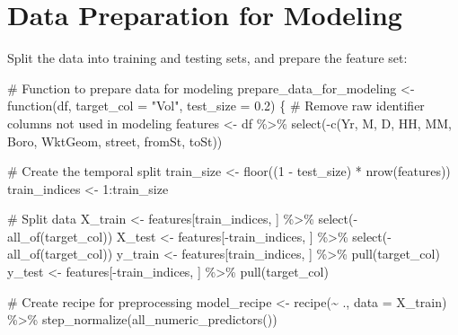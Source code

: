 \documentclass[
  letterpaper,
  DIV=11,
  numbers=noendperiod]{scrreprt}
\newenvironment{Shaded}{\begin{snugshade}}{\end{snugshade}}
\newcommand{\AttributeTok}[1]{\textcolor[rgb]{0.40,0.45,0.13}{#1}}
\newcommand{\CommentTok}[1]{\textcolor[rgb]{0.37,0.37,0.37}{#1}}
\newcommand{\ControlFlowTok}[1]{\textcolor[rgb]{0.00,0.23,0.31}{#1}}
\newcommand{\DecValTok}[1]{\textcolor[rgb]{0.68,0.00,0.00}{#1}}
\newcommand{\FloatTok}[1]{\textcolor[rgb]{0.68,0.00,0.00}{#1}}
\newcommand{\FunctionTok}[1]{\textcolor[rgb]{0.28,0.35,0.67}{#1}}
\newcommand{\NormalTok}[1]{\textcolor[rgb]{0.00,0.23,0.31}{#1}}
\newcommand{\OtherTok}[1]{\textcolor[rgb]{0.00,0.23,0.31}{#1}}
\newcommand{\SpecialCharTok}[1]{\textcolor[rgb]{0.37,0.37,0.37}{#1}}
\newcommand{\StringTok}[1]{\textcolor[rgb]{0.13,0.47,0.30}{#1}}
\begin{document}
\section{Data Preparation for
Modeling}\label{data-preparation-for-modeling}

Split the data into training and testing sets, and prepare the feature
set:

\begin{Shaded}
\begin{Highlighting}[]
\CommentTok{\# Function to prepare data for modeling}
\NormalTok{prepare\_data\_for\_modeling }\OtherTok{\textless{}{-}} \ControlFlowTok{function}\NormalTok{(df, }\AttributeTok{target\_col =} \StringTok{"Vol"}\NormalTok{, }\AttributeTok{test\_size =} \FloatTok{0.2}\NormalTok{) \{}
  \CommentTok{\# Remove raw identifier columns not used in modeling}
\NormalTok{  features }\OtherTok{\textless{}{-}}\NormalTok{ df }\SpecialCharTok{\%\textgreater{}\%}
    \FunctionTok{select}\NormalTok{(}\SpecialCharTok{{-}}\FunctionTok{c}\NormalTok{(Yr, M, D, HH, MM, Boro, WktGeom, street, fromSt, toSt))}
  
  \CommentTok{\# Create the temporal split}
\NormalTok{  train\_size }\OtherTok{\textless{}{-}} \FunctionTok{floor}\NormalTok{((}\DecValTok{1} \SpecialCharTok{{-}}\NormalTok{ test\_size) }\SpecialCharTok{*} \FunctionTok{nrow}\NormalTok{(features))}
\NormalTok{  train\_indices }\OtherTok{\textless{}{-}} \DecValTok{1}\SpecialCharTok{:}\NormalTok{train\_size}
  
  \CommentTok{\# Split data}
\NormalTok{  X\_train }\OtherTok{\textless{}{-}}\NormalTok{ features[train\_indices, ] }\SpecialCharTok{\%\textgreater{}\%} \FunctionTok{select}\NormalTok{(}\SpecialCharTok{{-}}\FunctionTok{all\_of}\NormalTok{(target\_col))}
\NormalTok{  X\_test }\OtherTok{\textless{}{-}}\NormalTok{ features[}\SpecialCharTok{{-}}\NormalTok{train\_indices, ] }\SpecialCharTok{\%\textgreater{}\%} \FunctionTok{select}\NormalTok{(}\SpecialCharTok{{-}}\FunctionTok{all\_of}\NormalTok{(target\_col))}
\NormalTok{  y\_train }\OtherTok{\textless{}{-}}\NormalTok{ features[train\_indices, ] }\SpecialCharTok{\%\textgreater{}\%} \FunctionTok{pull}\NormalTok{(target\_col)}
\NormalTok{  y\_test }\OtherTok{\textless{}{-}}\NormalTok{ features[}\SpecialCharTok{{-}}\NormalTok{train\_indices, ] }\SpecialCharTok{\%\textgreater{}\%} \FunctionTok{pull}\NormalTok{(target\_col)}
  
  \CommentTok{\# Create recipe for preprocessing}
\NormalTok{  model\_recipe }\OtherTok{\textless{}{-}} \FunctionTok{recipe}\NormalTok{(}\SpecialCharTok{\textasciitilde{}}\NormalTok{ ., }\AttributeTok{data =}\NormalTok{ X\_train) }\SpecialCharTok{\%\textgreater{}\%}
    \FunctionTok{step\_normalize}\NormalTok{(}\FunctionTok{all\_numeric\_predictors}\NormalTok{())}
  

\end{Highlighting}
\end{Shaded}
\end{document}
